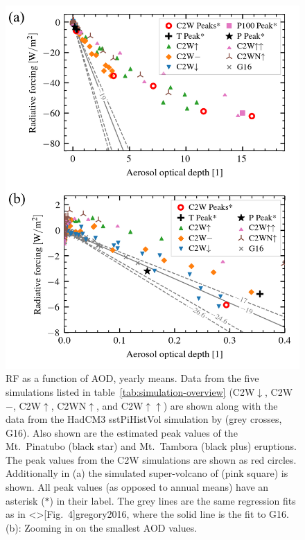 \documentclass[draft]{agujournal2019}
\begin{document}
\begin{figure}
  \centering
  \includegraphics{figures/figure2.png}

  \caption{RF as a function of AOD, yearly means. Data from the five simulations listed in
    table~\ref{tab:simulation-overview} (C2W\(\downarrow\), C2W\(-\), C2W\(\uparrow\),
    C2WN\(\uparrow\), and C2W\(\uparrow\uparrow\)) are shown along with the data from the
    HadCM3 sstPiHistVol simulation by  (grey crosses, G16). Also shown
    are the estimated peak values of the Mt.\ Pinatubo (black star) and Mt.\ Tambora (black
    plus) eruptions. The peak values from the C2W simulations are shown as red circles.
    Additionally in (a) the simulated super-volcano of  (pink square) is
    shown. All peak values (as opposed to annual means) have an asterisk (\(\ast{}\)) in
    their label. The grey lines are the same regression fits as in \citeA<>[Fig.\
      4]{gregory2016}, where the solid line is the fit to G16. (b): Zooming in on the smallest
    AOD values.}\label{fig:2_rf_vs_aod_slopes}%
\end{figure}
\end{document}
